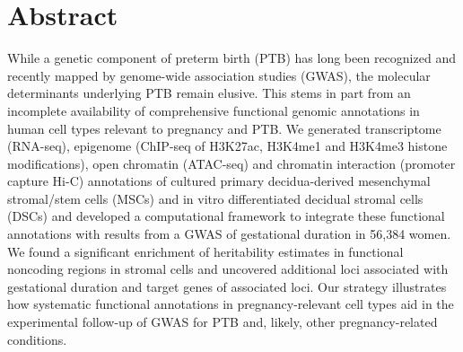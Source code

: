 


  \section{Abstract}
  While a genetic component of preterm birth (PTB) has long been recognized and recently mapped by genome-wide association studies (GWAS), the molecular determinants underlying PTB remain elusive. This stems in part from an incomplete availability of comprehensive functional genomic annotations in human cell types relevant to pregnancy and PTB. We generated transcriptome (RNA-seq), epigenome (ChIP-seq of H3K27ac, H3K4me1 and H3K4me3 histone modifications), open chromatin (ATAC-seq) and chromatin interaction (promoter capture Hi-C) annotations of cultured primary decidua-derived mesenchymal stromal/stem cells (MSCs) and in vitro differentiated decidual stromal cells (DSCs) and developed a computational framework to integrate these functional annotations with results from a GWAS of gestational duration in 56,384 women. We found a significant enrichment of heritability estimates in functional noncoding regions in stromal cells and uncovered additional loci associated with gestational duration and target genes of associated loci. Our strategy illustrates how systematic functional annotations in pregnancy-relevant cell types aid in the experimental follow-up of GWAS for PTB and, likely, other pregnancy-related conditions.

